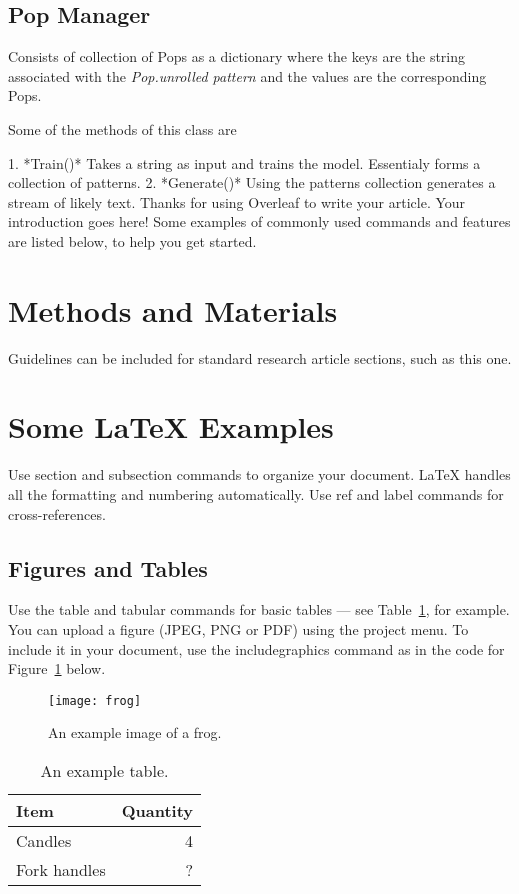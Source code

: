 \documentclass[fleqn,10pt]{olplainarticle}
\begin{document}
\subsection{Pop Manager}
Consists of collection of Pops as a dictionary where the keys are the string associated with the \textit{Pop.unrolled pattern} and the values are the corresponding Pops.

Some of the methods of this class are 

1. *Train()* Takes a string as input and trains the model. Essentialy forms a collection of patterns.
2. *Generate()* Using the patterns collection generates a stream of likely text. 
Thanks for using Overleaf to write your article. Your introduction goes here! Some examples of commonly used commands and features are listed below, to help you get started.

\section*{Methods and Materials}

Guidelines can be included for standard research article sections, such as this one.

\section*{Some \LaTeX{} Examples}
\label{sec:examples}

Use section and subsection commands to organize your document. \LaTeX{} handles all the formatting and numbering automatically. Use ref and label commands for cross-references.

\subsection*{Figures and Tables}

Use the table and tabular commands for basic tables --- see Table~\ref{tab:widgets}, for example. You can upload a figure (JPEG, PNG or PDF) using the project menu. To include it in your document, use the includegraphics command as in the code for Figure~\ref{fig:view} below.

\begin{figure}[ht]
\centering
\texttt{[image: frog]}
\caption{An example image of a frog.}
\label{fig:view}
\end{figure}

\begin{table}[ht]
\centering
\begin{tabular}{l|r}
Item & Quantity \\\hline
Candles & 4 \\
Fork handles & ?  
\end{tabular}
\caption{\label{tab:widgets}An example table.}
\end{table}
\end{document}
